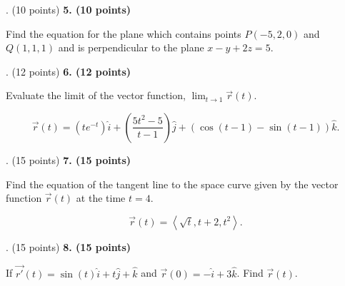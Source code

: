 \documentclass[12pt]{article}
\makeatletter
\newenvironment{problem}[1][]{%
  \bigskip%
  \noindent\begin{boxedminipage}{\columnwidth}%
  \def\@tempa{#1}%
  \ifx\@tempa\empty\else%
    \textbf{#1}\hspace{0.5em}%
  \fi%
}{%
  \end{boxedminipage}%
}
\makeatother
\begin{document}
\newpage
\begin{problem}[5. (10 points)]
Find the equation for the plane which contains points $P(-5,2,0)$ and $Q(1,1,1)$ and is perpendicular to the plane $x-y+2z = 5$.
\end{problem}


\newpage
\begin{problem}[6. (12 points)]
Evaluate the limit of the vector function, $\lim_{t\to 1}\vec{r}(t)$.

\begin{equation*}
\vec{r}(t) = (te^{-t}) \hat{i} + \left(\frac{5t^2-5}{t-1}\right) \hat{j} + \left(\cos(t-1)-\sin(t-1)\right)\hat{k}.
\end{equation*}
\end{problem}


\newpage
\begin{problem}[7. (15 points)]
Find the equation of the tangent line to the space curve given by the vector function $\vec{r}(t)$ at the time $t = 4$.

\begin{equation*}
    \vec{r}(t) = \left\langle \sqrt{t}, t+2, t^2 \right\rangle.
\end{equation*}
\end{problem}


\newpage
\begin{problem}[8. (15 points)]
If $\vec{r'}(t) = \sin(t) \hat{i} + t \hat{j} + \hat{k}$ and $\vec{r}(0) = -\hat{i} + 3\hat{k}$. Find $\vec{r}(t)$.
\end{problem}
\end{document}
